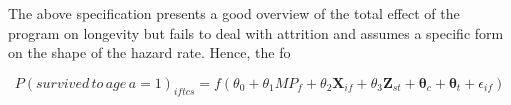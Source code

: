 The above specification presents a good overview of the total effect of the program on longevity but fails to deal with attrition and assumes a specific form on the shape of the hazard rate. Hence, the fo

$$
P(survived\,to\,age\,a=1)_{iftcs} = f(\theta_0 + \theta_1MP_f + \theta_2\mathbf{X}_{if} + \theta_3\mathbf{Z}_{st} + \mathbf{\theta}_c + \mathbf{\theta}_t + \epsilon_{if})
$$